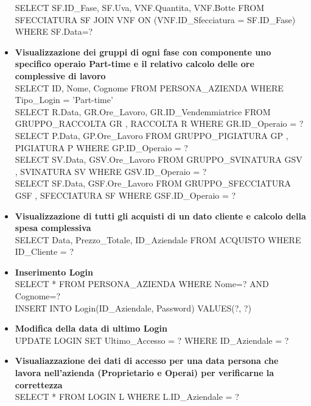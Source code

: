 \documentclass{article}
\begin{document}
\begin{itemize}
SELECT SF.ID\_Fase, SF.Uva, VNF.Quantita, VNF.Botte FROM SFECCIATURA SF JOIN VNF ON (VNF.ID\_Sfecciatura = SF.ID\_Fase) WHERE SF.Data=?\\\newline
\item \textbf{Visualizzazione dei gruppi di ogni fase con componente uno specifico operaio Part-time e il relativo calcolo delle ore complessive di lavoro }\\\newline
SELECT ID, Nome, Cognome FROM PERSONA\_AZIENDA WHERE Tipo\_Login = 'Part-time'\\\newline
SELECT R.Data, GR.Ore\_Lavoro, GR.ID\_Vendemmiatrice FROM GRUPPO\_RACCOLTA GR , RACCOLTA R WHERE GR.ID\_Operaio = ?\\\newline
SELECT P.Data, GP.Ore\_Lavoro FROM GRUPPO\_PIGIATURA GP , PIGIATURA P WHERE GP.ID\_Operaio = ?\\\newline
SELECT SV.Data, GSV.Ore\_Lavoro FROM GRUPPO\_SVINATURA GSV , SVINATURA SV WHERE GSV.ID\_Operaio = ?\\\newline
SELECT SF.Data, GSF.Ore\_Lavoro FROM GRUPPO\_SFECCIATURA GSF , SFECCIATURA SF WHERE GSF.ID\_Operaio = ?\\\newline
\item \textbf{Visualizzazione di tutti gli acquisti di un dato cliente  e calcolo della spesa complessiva }\\\newline
SELECT Data, Prezzo\_Totale, ID\_Aziendale FROM ACQUISTO WHERE ID\_Cliente = ? \\\newline
\item \textbf{Inserimento Login}\\\newline
SELECT * FROM PERSONA\_AZIENDA WHERE Nome=? AND Cognome=? \\\newline
INSERT INTO Login(ID\_Aziendale, Password) VALUES(?, ?)\\\newline
\item \textbf{Modifica della data di ultimo Login}\\\newline
UPDATE LOGIN SET Ultimo\_Accesso = ? WHERE ID\_Aziendale = ? \\\newline
\item \textbf{Visualiazzazione dei dati di accesso per una data persona che lavora nell'azienda (Proprietario e Operai) per verificarne la correttezza }\\\newline
SELECT * FROM LOGIN L WHERE L.ID\_Aziendale = ?\\\newline
\end{itemize}
\newpage
\end{document}
